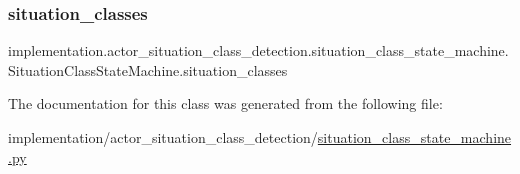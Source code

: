 \subsubsection{\texorpdfstring{situation\+\_\+classes}{situation\_classes}}
{\footnotesize\ttfamily implementation.\+actor\+\_\+situation\+\_\+class\+\_\+detection.\+situation\+\_\+class\+\_\+state\+\_\+machine.\+Situation\+Class\+State\+Machine.\+situation\+\_\+classes}



The documentation for this class was generated from the following file\+:\begin{DoxyCompactItemize}
\item 
implementation/actor\+\_\+situation\+\_\+class\+\_\+detection/\hyperlink{situation__class__state__machine_8py}{situation\+\_\+class\+\_\+state\+\_\+machine.\+py}\end{DoxyCompactItemize}

